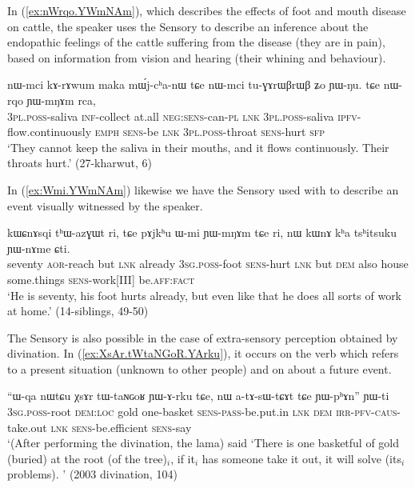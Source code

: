 In (\ref{ex:nWrqo.YWmNAm}), which describes the effects of foot and mouth disease on cattle, the speaker uses the Sensory to describe an inference about the endopathic feelings of the cattle suffering from the disease (they are in pain), based on information from vision and hearing (their whining and behaviour).

\begin{exe}
\ex \label{ex:nWrqo.YWmNAm}
\gll nɯ-mci kɤ-rɤwum maka mɯ́j-cʰa-nɯ tɕe nɯ-mci tu-ɣɤrɯβrɯβ ʑo ɲɯ-ŋu. tɕe nɯ-rqo ɲɯ-mŋɤm rca, \\
\textsc{3pl}.\textsc{poss}-saliva \textsc{inf}-collect at.all \textsc{neg}:\textsc{sens}-can-\textsc{pl} \textsc{lnk} \textsc{3pl}.\textsc{poss}-saliva \textsc{ipfv}-flow.continuously \textsc{emph} \textsc{sens}-be \textsc{lnk} \textsc{3pl}.\textsc{poss}-throat \textsc{sens}-hurt \textsc{sfp} \\
\glt `They cannot keep the saliva in their mouths, and it flows continuously. Their throats hurt.' (27-kharwut, 6)
\end{exe}

In (\ref{ex:Wmi.YWmNAm}) likewise we have the Sensory used with  to describe an event visually witnessed by the speaker.

\begin{exe}
\ex \label{ex:Wmi.YWmNAm}
\gll kɯɕnɤsqi tʰɯ-azɣɯt ri, tɕe pɤjkʰu ɯ-mi ɲɯ-mŋɤm tɕe ri, nɯ kɯnɤ kʰa tsʰitsuku ɲɯ-nɤme ɕti. \\
seventy \textsc{aor}-reach but \textsc{lnk} already \textsc{3sg}.\textsc{poss}-foot \textsc{sens}-hurt \textsc{lnk} but \textsc{dem} also house some.things \textsc{sens}-work[III] be.\textsc{aff}:\textsc{fact} \\
\glt `He is seventy, his foot hurts already, but even like that he does all sorts of work at home.' (14-siblings, 49-50)
\end{exe}
 
The Sensory is also possible in the case of extra-sensory perception obtained by divination. In (\ref{ex:XsAr.tWtaNGoR.YArku}), it occurs on the verb  which refers to a present situation (unknown to other people) and on  about a future event.
 
\begin{exe}
\ex \label{ex:XsAr.tWtaNGoR.YArku}
\gll ``ɯ-qa nɯtɕu χsɤr tɯ-taɴɢoʁ ɲɯ-ɤ-rku tɕe, nɯ a-tɤ-sɯ-tɕɤt tɕe ɲɯ-pʰɤn'' ɲɯ-ti \\
\textsc{3sg}.\textsc{poss}-root \textsc{dem}:\textsc{loc} gold one-basket \textsc{sens}-\textsc{pass}-be.put.in \textsc{lnk} \textsc{dem} \textsc{irr}-\textsc{pfv}-\textsc{caus}-take.out \textsc{lnk} \textsc{sens}-be.efficient \textsc{sens}-say \\
\glt `(After performing the divination, the lama) said `There is one basketful of gold (buried) at the root (of the tree)$_i$, if it$_i$ has someone take it out, it will solve (its$_i$ problems). ' (2003 divination, 104)
\end{exe}

